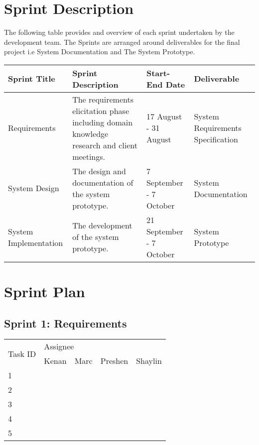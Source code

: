 \documentclass[11pt]{article}
\begin{document}
\section{Sprint Description}
The following table provides and overview of each sprint undertaken by the development team. The Sprints are arranged around deliverables for the final project i.e System Documentation and The System Prototype.
\begin{table}[H]
	\hskip-4.0cm\begin{tabular}[\textwidth]{@{}|l|l|l|l|@{}}
		\toprule
		Sprint Title & Sprint Description & Start-End Date & Deliverable \\ \midrule
		Requirements & \begin{minipage}{0.3\textwidth}
		The requirements elicitation phase including domain knowledge research and client meetings.
		\end{minipage} & 17 August - 31 August & System Requirements Specification \\ \midrule
	System Design	&  \begin{minipage}{0.3\textwidth}
		The design and documentation of the system prototype.
	\end{minipage} & 7 September - 7 October & System Documentation\\ \midrule
	System Implementation  &\begin{minipage}{0.3\textwidth}
		The development of the system prototype.
	\end{minipage}  & 21 September - 7 October & System Prototype\\ \bottomrule
	\end{tabular}
\end{table}

\section{Sprint Plan}

\subsection{Sprint 1: Requirements}

\begin{table}[H]
	\begin{tabular}{@{}|l||l|l|l|l|@{}}
		\toprule
		\multirow{2}{*}{Task ID} & \multicolumn{4}{l|}{Assignee}    \\ \cmidrule(l){2-5} 
		& Kenan & Marc & Preshen & Shaylin \\ \midrule
	1	&   \checkmark    &\checkmark      &\checkmark         &     \checkmark    \\ \midrule
	2	&   \checkmark    &    \checkmark  &   \checkmark      &      \checkmark   \\ \midrule
	3	&     &      &         &     \checkmark    \\ \midrule
	4	&   \checkmark    &    \checkmark  &    \checkmark     &         \\ \midrule
	5	&   \checkmark    &      &         & \checkmark        \\ \bottomrule
	\end{tabular}
\end{table}
\end{document}
